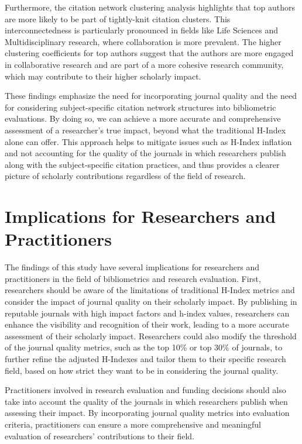 Furthermore, the citation network clustering analysis highlights that top
authors are more likely to be part of tightly-knit citation clusters. This
interconnectedness is particularly pronounced in fields like Life Sciences and
Multidisciplinary research, where collaboration is more prevalent. The higher
clustering coefficients for top authors suggest that the authors are more
engaged in collaborative research and are part of a more cohesive research
community, which may contribute to their higher scholarly impact.

These findings emphasize the need for incorporating journal quality and the
need for considering subject-specific citation network structures into
bibliometric evaluations. By doing so, we can achieve a more accurate and
comprehensive assessment of a researcher's true impact, beyond what the
traditional H-Index alone can offer. This approach helps to mitigate issues
such as H-Index inflation and not accounting for the quality of the journals in
which researchers publish along with the subject-specific citation practices,
and thus provides a clearer picture of scholarly contributions regardless of
the field of research.

\section{Implications for Researchers and Practitioners}

The findings of this study have several implications for researchers and
practitioners in the field of bibliometrics and research evaluation. First,
researchers should be aware of the limitations of traditional H-Index metrics
and consider the impact of journal quality on their scholarly impact. By
publishing in reputable journals with high impact factors and h-index values,
researchers can enhance the visibility and recognition of their work, leading
to a more accurate assessment of their scholarly impact. Researchers could also
modify the threshold of the journal quality metrics, such as the top 10\% or
top 30\% of journals, to further refine the adjusted H-Indexes and tailor them
to their specific research field, based on how strict they want to be in
considering the journal quality.

Practitioners involved in research evaluation and funding decisions should also
take into account the quality of the journals in which researchers publish when
assessing their impact. By incorporating journal quality metrics into
evaluation criteria, practitioners can ensure a more comprehensive and
meaningful evaluation of researchers' contributions to their field.

